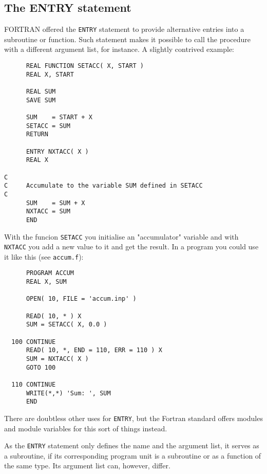 \subsection{The ENTRY statement}
FORTRAN offered the \verb+ENTRY+ statement to provide alternative entries into a subroutine or function.
Such statement makes it possible to call the procedure with a different argument list, for instance.
A slightly contrived example:
\begin{verbatim}
      REAL FUNCTION SETACC( X, START )
      REAL X, START

      REAL SUM
      SAVE SUM

      SUM    = START + X
      SETACC = SUM
      RETURN

      ENTRY NXTACC( X )
      REAL X

C
C     Accumulate to the variable SUM defined in SETACC
C
      SUM    = SUM + X
      NXTACC = SUM
      END
\end{verbatim}

With the funcion \verb+SETACC+ you initialise an "accumulator" variable and with \verb+NXTACC+
you add a new value to it and get the result. In a program you could use it like this (see \verb+accum.f+):
\begin{verbatim}
      PROGRAM ACCUM
      REAL X, SUM

      OPEN( 10, FILE = 'accum.inp' )

      READ( 10, * ) X
      SUM = SETACC( X, 0.0 )

  100 CONTINUE
      READ( 10, *, END = 110, ERR = 110 ) X
      SUM = NXTACC( X )
      GOTO 100

  110 CONTINUE
      WRITE(*,*) 'Sum: ', SUM
      END
\end{verbatim}

There are doubtless other uses for \verb+ENTRY+, but the Fortran standard offers modules and module
variables for this sort of things instead.

As the \verb+ENTRY+ statement only defines the name and the argument list, it serves as a subroutine,
if its corresponding program unit is a subroutine or as a function of the same type. Its argument list
can, however, differ.


